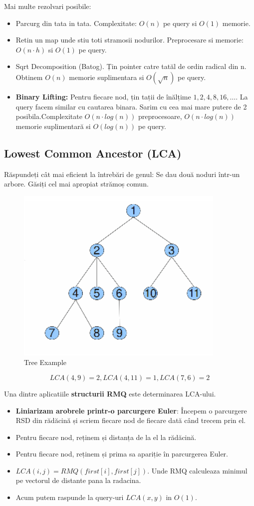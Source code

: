 \documentclass[11pt,a4paper]{article}
\theoremstyle{definition}
\theoremstyle{plain}
\theoremstyle{remark}
\begin{document}
Mai multe rezolvari posibile:
\begin{itemize}
    \item Parcurg din tata in tata. Complexitate: $O(n)$ pe query si $O(1)$ memorie.
    \item Retin un map unde stiu toti stramosii nodurilor. Preprocesare si memorie: $O(n \cdot h)$ si $O(1)$ pe query.
    \item Sqrt Decomposition (Batog). Țin pointer catre tatăl de ordin radical din n. Obtinem $O(n)$ memorie suplimentara si $O(\sqrt{n})$ pe query.

    \item \textbf{Binary Lifting:} Pentru fiecare nod, țin tații de înălțime $1, 2, 4, 8, 16, …$. La query facem similar cu cautarea binara. Sarim cu cea mai mare putere de 2 posibila.Complexitate $O(n \cdot log(n))$ preprocesoare, $O(n\cdot log(n))$ memorie suplimentară si $O(log(n))$ pe query.
\end{itemize}

\subsection{Lowest Common Ancestor (LCA)}
Răspundeți cât mai eficient la întrebări de genul: Se dau două noduri într-un arbore. Găsiți cel mai apropiat strămoș comun.

\begin{figure}[H]
    \centering
    \includegraphics[width=0.45\linewidth]{lca-tree.png}
    \caption{Tree Example}
    \label{fig:enter-label}
\end{figure}

$$LCA(4,9) = 2, LCA(4,11) = 1, LCA(7,6) = 2$$

Una dintre aplicatiile \textbf{structurii RMQ} este determinarea LCA-ului.


\begin{itemize}
    \item \textbf{Liniarizam arobrele printr-o parcurgere Euler}: Începem o parcurgere RSD din rădăcină și scriem fiecare nod de fiecare dată când trecem prin el.
    \item Pentru fiecare nod, reținem și distanța de la el la rădăcină.
    \item Pentru fiecare nod, reținem și prima sa apariție în parcurgerea Euler.
    \item $LCA(i,j) = RMQ(first[i], first[j])$. Unde RMQ calculeaza minimul pe vectorul de distante pana la radacina.
    \item Acum putem raspunde la query-uri $LCA(x,y)$ in $O(1)$.
\end{itemize}
\end{document}
